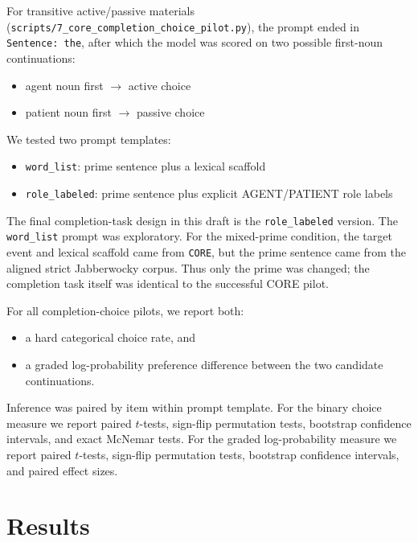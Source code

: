 \documentclass[11pt]{article}
\begin{document}
For transitive active/passive materials
(\texttt{scripts/7\_core\_completion\_choice\_pilot.py}), the prompt
ended in \texttt{Sentence: the}, after which the model was scored on two
possible first-noun continuations:

\begin{itemize}[leftmargin=*]
    \item agent noun first \(\rightarrow\) active choice
    \item patient noun first \(\rightarrow\) passive choice
\end{itemize}

We tested two prompt templates:

\begin{itemize}[leftmargin=*]
    \item \texttt{word\_list}: prime sentence plus a lexical scaffold
    \item \texttt{role\_labeled}: prime sentence plus explicit AGENT/PATIENT role labels
\end{itemize}

The final completion-task design in this draft is the
\texttt{role\_labeled} version. The \texttt{word\_list} prompt was exploratory.
For the mixed-prime condition, the target event and lexical scaffold came from
\texttt{CORE}, but the prime sentence came from the aligned strict Jabberwocky
corpus. Thus only the prime was changed; the completion task itself was
identical to the successful CORE pilot.

For all completion-choice pilots, we report both:

\begin{itemize}[leftmargin=*]
    \item a hard categorical choice rate, and
    \item a graded log-probability preference difference between the two candidate continuations.
\end{itemize}

Inference was paired by item within prompt template. For the binary choice
measure we report paired \(t\)-tests, sign-flip permutation tests, bootstrap
confidence intervals, and exact McNemar tests. For the graded log-probability
measure we report paired \(t\)-tests, sign-flip permutation tests, bootstrap
confidence intervals, and paired effect sizes.

\section*{Results}
\end{document}
